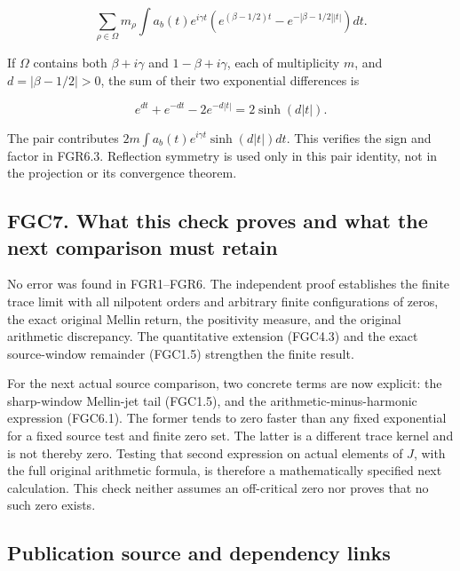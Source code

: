 \[
 \sum_{\rho\in\Omega}m_\rho\int a_b(t)e^{i\gamma t}
 \left(e^{(\beta-1/2)t}-e^{-|\beta-1/2||t|}\right)dt.
\tag{FGC6.1}
\]

If \(\Omega\) contains both \(\beta+i\gamma\) and \(1-\beta+i\gamma\),
each of multiplicity \(m\), and \(d=|\beta-1/2|>0\), the sum of their
two exponential differences is

\[
 e^{dt}+e^{-dt}-2e^{-d|t|}=2\sinh(d|t|).
\]

The pair contributes \(2m\int a_b(t)e^{i\gamma t}\sinh(d|t|)dt\). This
verifies the sign and factor in FGR6.3. Reflection symmetry is used only
in this pair identity, not in the projection or its convergence theorem.

\subsection{FGC7. What this check proves and what the next comparison
must
retain}\label{fgc7.-what-this-check-proves-and-what-the-next-comparison-must-retain}

No error was found in FGR1--FGR6. The independent proof establishes the
finite trace limit with all nilpotent orders and arbitrary finite
configurations of zeros, the exact original Mellin return, the
positivity measure, and the original arithmetic discrepancy. The
quantitative extension (FGC4.3) and the exact source-window remainder
(FGC1.5) strengthen the finite result.

For the next actual source comparison, two concrete terms are now
explicit: the sharp-window Mellin-jet tail (FGC1.5), and the
arithmetic-minus-harmonic expression (FGC6.1). The former tends to zero
faster than any fixed exponential for a fixed source test and finite
zero set. The latter is a different trace kernel and is not thereby
zero. Testing that second expression on actual elements of \(J\), with
the full original arithmetic formula, is therefore a mathematically
specified next calculation. This check neither assumes an off-critical
zero nor proves that no such zero exists.

\subsection{Publication source and dependency
links}\label{publication-source-and-dependency-links}

